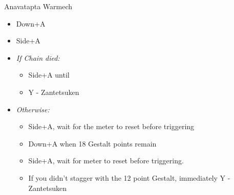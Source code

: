 \begin{battle}[0:27]{Anavatapta Warmech}
	\begin{itemize}
		\item Down+A
		\item Side+A
		\item \textit{If Chain died:}
		      \begin{itemize}
			      \item Side+A until \stagger
			      \item Y - Zantetsuken
		      \end{itemize}
		\item \textit{Otherwise:}
		      \begin{itemize}
			      \item Side+A, wait for the meter to reset before triggering
			      \item Down+A when 18 Gestalt points remain
			      \item Side+A, wait for meter to reset before triggering.
			      \item If you didn't stagger with the 12 point Gestalt, immediately Y - Zantetsuken
		      \end{itemize}
	\end{itemize}
\end{battle}